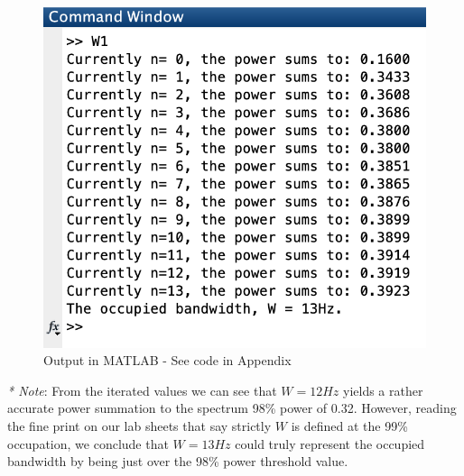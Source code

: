 \documentclass[11pt]{article}
\begin{document}
\begin{enumerate}[label=(\alph*)]
    \begin{figure}[h]
        \centering
        \includegraphics[scale=0.6]{W1Q1b.png}
        \caption{Output in MATLAB - See code in Appendix}
        \label{fig:W1Q1b}
    \end{figure}{}
    \textit{* Note}: From the iterated values we can see that $W=12Hz$ yields a rather accurate power summation to the spectrum 98\% power of 0.32. However, reading the fine print on our lab sheets that say strictly $W$ is defined at the 99\% occupation, we conclude that $W=13Hz$ could truly represent the occupied bandwidth by being just over the 98\% power threshold value.
\end{enumerate}

\end{document}
